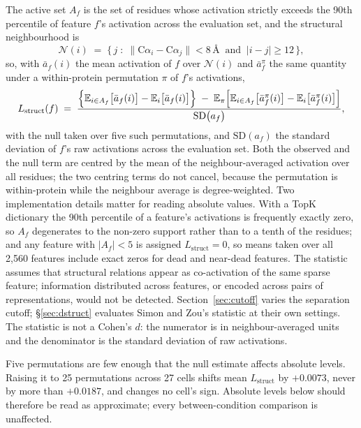 \documentclass{article} %
\newcommand{\red}[1]{\textcolor{red}{#1}}
\newcommand{\opentag}[1]{\textcolor{red}{\textsuperscript{[\ref{#1}]}}}
\newcommand{\pend}[2]{\red{#1}\opentag{#2}}
\renewcommand{\red}[1]{#1}
\renewcommand{\opentag}[1]{}
\renewcommand{\pend}[2]{#1}
\newcommand{\Lstruct}{\ensuremath{L_{\mathrm{struct}}}}
\newcommand{\angstrom}{\text{\AA}}
\begin{document}
The active set $A_f$ is the set of residues whose activation strictly exceeds the 90th percentile
of feature $f$'s activation across the evaluation set, and the structural neighbourhood is
%
\begin{equation}
\mathcal{N}(i) \;=\; \bigl\{\, j \;:\; \lVert \mathrm{C}\alpha_i - \mathrm{C}\alpha_j \rVert <
8\,\angstrom \;\; \text{and} \;\; |i - j| \ge 12 \,\bigr\},
\label{eq:neighbourhood}
\end{equation}
%
so, with $\bar{a}_f(i)$ the mean activation of $f$ over $\mathcal{N}(i)$ and
$\bar{a}^{\pi}_f$ the same quantity under a within-protein permutation $\pi$ of $f$'s
activations,
%
\begin{equation}
\Lstruct(f) \;=\;
\frac{\Bigl\{\mathbb{E}_{i \in A_f}\bigl[\bar{a}_f(i)\bigr] - \mathbb{E}_{i}\bigl[\bar{a}_f(i)\bigr]\Bigr\}
      \;-\; \mathbb{E}_{\pi}\Bigl[\mathbb{E}_{i \in A_f}\bigl[\bar{a}^{\pi}_f(i)\bigr]
            - \mathbb{E}_{i}\bigl[\bar{a}^{\pi}_f(i)\bigr]\Bigr]}
     {\mathrm{SD}\bigl(a_f\bigr)},
\label{eq:lstruct}
\end{equation}
%
with the null taken over five such permutations, and $\mathrm{SD}(a_f)$ the standard deviation
of $f$'s raw activations across the evaluation set. Both the observed and the null term are
centred by the mean of the neighbour-averaged activation over all residues; the two centring
terms do not cancel, because the permutation is within-protein while the neighbour average is
degree-weighted. Two implementation details matter for reading absolute values. With a TopK
dictionary the 90th percentile of a feature's activations is frequently exactly zero, so $A_f$
degenerates to the non-zero support rather than to a tenth of the residues; and any feature with
$|A_f| < 5$ is assigned $\Lstruct = 0$, so means taken over all 2{,}560 features include exact
zeros for dead and near-dead features. The statistic assumes that structural relations appear as co-activation of the
same sparse feature; \pend{information distributed across features, or encoded across pairs of
representations, would not be detected}{t:pairwise}. Section~\ref{sec:cutoff} varies the separation cutoff;
\S\ref{sec:dstruct} evaluates Simon and Zou's statistic at their own settings. The statistic is
not a Cohen's $d$: the numerator is in neighbour-averaged units and the denominator is the
standard deviation of raw activations.

\pend{Five permutations are few enough that the null estimate affects absolute levels. Raising it
to 25 permutations across 27 cells shifts mean \Lstruct{} by $+0.0073$, never by more than
$+0.0187$, and changes no cell's sign. Absolute levels below should therefore be read as
approximate; every between-condition comparison is unaffected.}{t:perm100}
\end{document}
